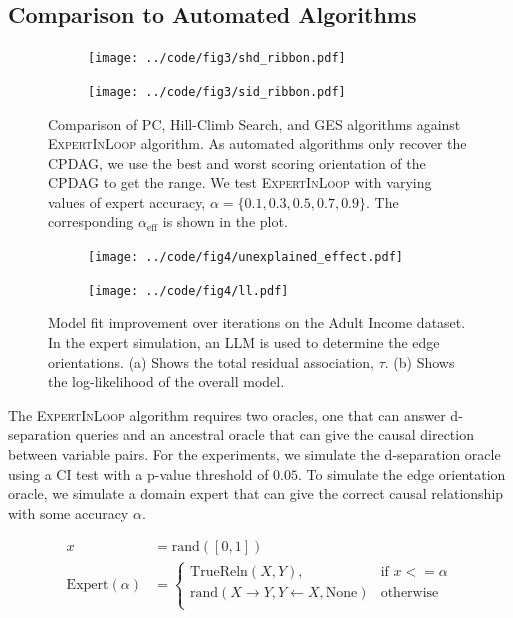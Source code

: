\documentclass{uai2025} %
\begin{document}
\subsection{Comparison to Automated Algorithms}
\begin{figure}[t!]
	\centering
	\begin{subfigure}{0.5\textwidth}
		\centering
		\texttt{[image: ../code/fig3/shd\_ribbon.pdf]}
		\caption{}
	\end{subfigure}
	\begin{subfigure}{0.5\textwidth}
		\centering
		\texttt{[image: ../code/fig3/sid\_ribbon.pdf]}
		\caption{}
	\end{subfigure}
	\caption{Comparison of PC, Hill-Climb Search, and GES algorithms against
		\textsc{ExpertInLoop} algorithm. As automated algorithms only
		recover the CPDAG, we use the best and worst scoring
		orientation of the CPDAG to get the range. We test
		\textsc{ExpertInLoop} with varying values of expert accuracy, $ \alpha = \{0.1, 0.3, 0.5, 0.7, 0.9\} $. The corresponding
		$\alpha_{\textrm{eff}} $ is shown in the plot.}
	\label{fig:shd_sid}
\end{figure}

\begin{figure}[t!]
	\begin{subfigure}{0.25\textwidth}
		\centering
		\texttt{[image: ../code/fig4/unexplained\_effect.pdf]}
		\caption{}
	\end{subfigure}%
	\begin{subfigure}{0.25\textwidth}
		\centering
		\texttt{[image: ../code/fig4/ll.pdf]}
		\caption{}
	\end{subfigure}
	\caption{Model fit improvement over iterations on the Adult Income dataset. In the expert simulation, an 
		LLM is used to determine the edge orientations. (a) Shows the total residual association, $\tau$. 
		(b) Shows the log-likelihood of the overall model.
	}
	\label{fig:unexplained_ll}
\end{figure}

The \textsc{ExpertInLoop} algorithm requires two oracles, one that can answer
d-separation queries and an ancestral oracle that can give the causal direction
between variable pairs. For the experiments, we simulate the d-separation
oracle using a CI test with a p-value threshold of $ 0.05 $. To simulate the
edge orientation oracle, we simulate a domain expert that can give the correct
causal relationship with some accuracy $ \alpha $.

\begin{equation}
	\begin{split}
		x &= \textrm{rand}([0, 1]) \\
		\mathrm{Expert}(\alpha) &= \begin{cases} 
			\mathrm{TrueReln}(X, Y),  & \textrm{if  } x <= \alpha \\
			\textrm{rand}(X \rightarrow Y, Y \leftarrow X, \textrm{None}) & \textrm{otherwise} \\
				\end{cases} \\
	\end{split}
\end{equation}
\end{document}
